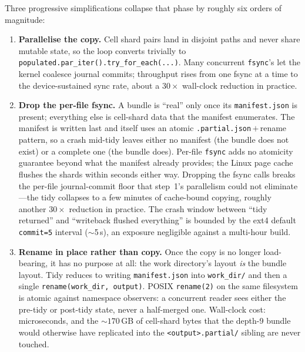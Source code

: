 \documentclass[twocolumn, 10pt]{article}
\begin{document}
Three progressive simplifications collapse that phase by roughly six
orders of magnitude:

\begin{enumerate}
  \item \textbf{Parallelise the copy.} Cell shard pairs land in
    disjoint paths and never share mutable state, so the loop
    converts trivially to
    \texttt{populated.par\_iter().try\_for\_each(...)}. Many
    concurrent \texttt{fsync}'s let the kernel coalesce journal
    commits; throughput rises from one fsync at a time to the
    device-sustained sync rate, about a $30\times$ wall-clock
    reduction in practice.

  \item \textbf{Drop the per-file fsync.} A bundle is ``real'' only
    once its \texttt{manifest.json} is present; everything else is
    cell-shard data that the manifest enumerates. The manifest is
    written last and itself uses an atomic
    \texttt{.partial.json}\,$+$\,rename pattern, so a crash mid-tidy
    leaves either no manifest (the bundle does not exist) or a
    complete one (the bundle does). Per-file \texttt{fsync} adds no
    atomicity guarantee beyond what the manifest already provides;
    the Linux page cache flushes the shards within seconds either
    way. Dropping the fsync calls breaks the per-file
    journal-commit floor that step~1's parallelism could not
    eliminate---the tidy collapses to a few minutes of cache-bound
    copying, roughly another $30\times$ reduction in practice. The
    crash window between ``tidy returned'' and ``writeback flushed
    everything'' is bounded by the ext4 default \texttt{commit=5}
    interval ($\sim$5\,s), an exposure negligible against a
    multi-hour build.

  \item \textbf{Rename in place rather than copy.} Once the copy is
    no longer load-bearing, it has no purpose at all: the work
    directory's layout \emph{is} the bundle layout. Tidy reduces to
    writing \texttt{manifest.json} into \texttt{work\_dir/} and then
    a single \texttt{rename(work\_dir, output)}. POSIX
    \texttt{rename(2)} on the same filesystem is atomic against
    namespace observers: a concurrent reader sees either the
    pre-tidy or post-tidy state, never a half-merged one. Wall-clock
    cost: microseconds, and the ${\sim}170$\,GB of cell-shard bytes
    that the depth-9 bundle would otherwise have replicated into the
    \texttt{<output>.partial/} sibling are never touched.
\end{enumerate}
\end{document}
